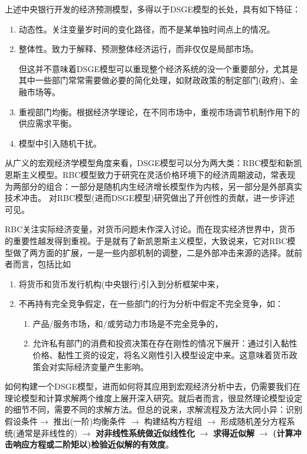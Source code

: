 上述中央银行开发的经济预测模型，多得以于DSGE模型的长处，具有如下特征：
\begin{enumerate}
  \item 动态性。关注变量岁时间的变化路径，而不是某单独时间点上的情况。
  \item 整体性。致力于解释、预测整体经济运行，而非仅仅是局部市场。

  但这并不意味着DSGE模型可以重现整个经济系统的没一个重要部分，尤其是其中一些部门常常需要做必要的简化处理，如财政政策的制定部门(政府)、金融市场等。
  \item 重视部门均衡。根据经济学理论，在不同市场中，重视市场调节机制作用下的供应需求平衡。
  \item 模型中引入随机干扰。
\end{enumerate}

从广义的宏观经济学模型角度来看，DSGE模型可以分为两大类：RBC模型和新凯恩斯主义模型。RBC模型致力于研究在灵活价格环境下的经济周期波动，常表现为两部分的组合：一部分是随机内生经济增长模型作为内核，另一部分是外部真实技术冲击。\cite{Kydland:1982cd} 对RBC模型(进而DSGE模型)研究做出了开创性的贡献，进一步评述可见\cite{Cooley:1995tq}。

RBC关注实际经济变量，对货币问题未作深入讨论。而在现实经济世界中，货币的重要性越发得到重视。于是就有了新凯恩斯主义模型，大致说来，它对RBC模型做了两方面的扩展，一是一些内部机制的调整，二是外部冲击来源的选择。就前者而言，包括比如
\begin{enumerate}
  \item 将货币和货币发行机构(中央银行)引入到分析框架中来，
  \item 不再持有完全竞争假定，在一些部门的行为分析中假定不完全竞争，如：
  \begin{enumerate}
    \item 产品/服务市场，和/或劳动力市场是不完全竞争的，
    \item 允许私有部门的消费和投资决策在存在刚性的情况下展开：通过引入黏性价格、黏性工资的设定，将名义刚性引入模型设定中来。这意味着货币政策会对实际经济变量产生影响。
  \end{enumerate}
\end{enumerate}

如何构建一个DSGE模型，进而如何将其应用到宏观经济分析中去，仍需要我们在理论模型和计算求解两个维度上展开深入研究。就后者而言，很显然理论模型设定的细节不同，需要不同的求解方法。但总的说来，求解流程及方法大同小异：识别假设条件$\rightarrow$ 推出(一阶)均衡条件 $\rightarrow$ 构建结构方程组 $\rightarrow$ 形成随机差分方程系统(通常是非线性的) $\rightarrow$ \textbf{对非线性系统做近似线性化} $\rightarrow$ \textbf{求得近似解} $\rightarrow$ \textbf{(计算冲击响应方程或二阶矩以)检验近似解的有效度}。

